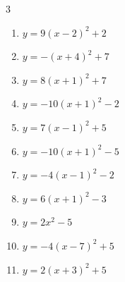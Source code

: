 \begin{multicols}{3}
\begin{enumerate}
        \phantom{$\displaystyle 頂点\left( -2 , 2 \right)$}

  \item $\displaystyle y=9\left( x-2\right)^{2}+2$

        \phantom{$\displaystyle 頂点\left( 2 , 2 \right)$}

  \item $\displaystyle y=-\left( x+4\right)^{2}+7$

        \phantom{$\displaystyle 頂点\left( -4 , 7 \right)$}

  \item $\displaystyle y=8\left( x+1\right)^{2}+7$

        \phantom{$\displaystyle 頂点\left( -1 , 7 \right)$}

  \item $\displaystyle y=-10\left( x+1\right)^{2}-2$

        \phantom{$\displaystyle 頂点\left( -1 , -2 \right)$}

  \item $\displaystyle y=7\left( x-1\right)^{2}+5$

        \phantom{$\displaystyle 頂点\left( 1 , 5 \right)$}

  \item $\displaystyle y=-10\left( x+1\right)^{2}-5$

        \phantom{$\displaystyle 頂点\left( -1 , -5 \right)$}

  \item $\displaystyle y=-4\left( x-1\right)^{2}-2$

        \phantom{$\displaystyle 頂点\left( 1 , -2 \right)$}

  \item $\displaystyle y=6\left( x+1\right)^{2}-3$

        \phantom{$\displaystyle 頂点\left( -1 , -3 \right)$}

  \item $\displaystyle y=2x^{2}-5$

        \phantom{$\displaystyle 頂点\left( 0 , -5 \right)$}

  \item $\displaystyle y=-4\left( x-7\right)^{2}+5$

        \phantom{$\displaystyle 頂点\left( 7 , 5 \right)$}

  \item $\displaystyle y=2\left( x+3\right)^{2}+5$

        \phantom{$\displaystyle 頂点\left( -3 , 5 \right)$}


\end{enumerate}
\end{multicols}
